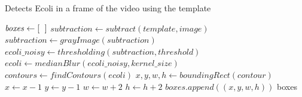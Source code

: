 \documentclass{article}
\begin{document}
\begin{algorithm}
    \caption{Detects Ecoli in a frame of the video using the template}
    \label{alg:detection}
    \renewcommand{\thealgorithm}{}
    \begin{algorithmic}[1]
        \State $\mathit{boxes} \gets \mathit{[\hspace{6px}]}$
        \State $\mathit{subtraction} \gets \mathit{subtract(template, image)}$
        \State $\mathit{subtraction} \gets \mathit{grayImage(subtraction)}$
        \State $\mathit{ecoli\_noisy} \gets \mathit{thresholding(subtraction, threshold)}$
        \State $\textit{ecoli} \gets \mathit{medianBlur(ecoli\_noisy, kernel\_size)}$
        \State $\textit{contours} \gets \mathit{findContours(ecoli)}$
            \State $x, y, w, h \gets \mathit{boundingRect(contour)}$
              
            \EndIf
            \State $x \gets x-1$ 
            \State $y \gets y-1$
            \State $w \gets w+2$
            \State $h \gets h+2$
            \State $\mathit{boxes.append((x, y, w, h))}$
        \EndFor
        \State \Return boxes
\end{algorithmic}\end{algorithm}
\end{document}

